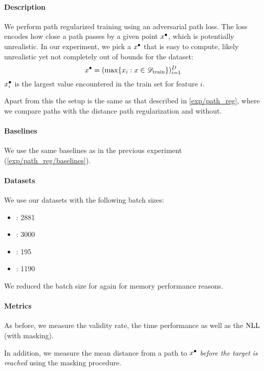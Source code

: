 \documentclass[../main.tex]{subfiles}
\begin{document}
\paragraph{Description}

We perform path regularized training using an adversarial path loss.
The loss encodes how close a path passes by a given point $x^\bullet$, which is potentially unrealistic.
In our experiment, we pick a $x^\bullet$ that is easy to compute, likely unrealistic yet not completely out of bounds for the dataset:
\begin{equation}
    x^\bullet = (\max\{ x_i : x \in \mathscr{D}_\text{train} \})_{i=1}^D
\end{equation}
\ie{} $x^\bullet_i$ is the largest value encountered in the train set for feature $i$.

Apart from this the setup is the same as that described in \autoref{exp/path_reg}, where we compare paths with the distance path regularization and without.

\paragraph{Baselines}

We use the same baselines as in the previous experiment (\autoref{exp/path_reg/baselines}).

\paragraph{Datasets}

We use our datasets with the following batch sizes:
\begin{itemize}
    \item \CakeOnSea: 2881
    \item \ForestCover: 3000
    \item \WineQuality: 195
    \item \OnlineNewsPopularity: 1190
\end{itemize}
We reduced the batch size for \ForestCover{} again for memory performance reasons.

\paragraph{Metrics}

As before, we measure the validity rate, the time performance as well as the $\text{NLL}$ (with masking).

In addition, we measure the mean distance from a path to $x^\bullet$ \emph{before the target is reached}
using the masking procedure.
\end{document}
